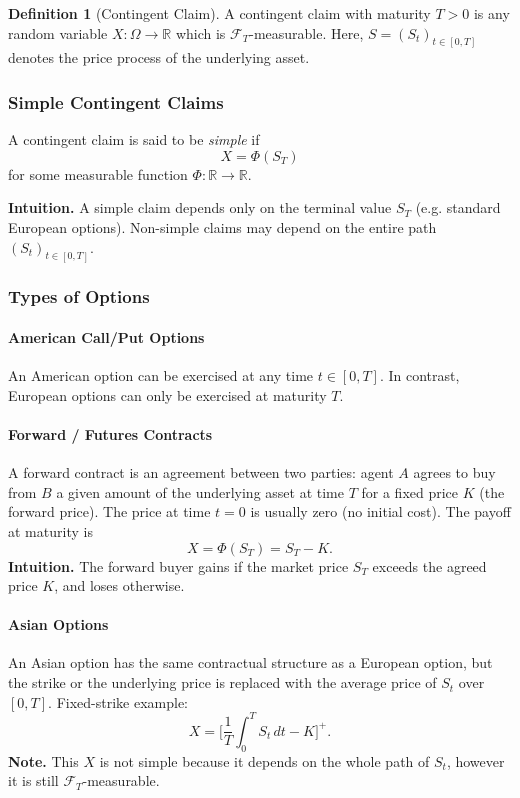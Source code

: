 \documentclass[12pt,a4paper]{article}
\theoremstyle{definition}
\newtheorem{definition}{Definition}[section]
\newcommand{\R}{\mathbb{R}}
\begin{document}
\begin{definition}[Contingent Claim]
A contingent claim with maturity $T>0$ is any random variable $X:\Omega\to\R$ which is $\mathcal{F}_T$-measurable. Here, $S=(S_t)_{t\in[0,T]}$ denotes the price process of the underlying asset.
\end{definition}

\subsubsection*{Simple Contingent Claims}
A contingent claim is said to be \emph{simple} if
\[
X = \Phi(S_T)
\]
for some measurable function $\Phi:\R\to\R$.

\textbf{Intuition.} A simple claim depends only on the terminal value $S_T$ (e.g. standard European options). Non-simple claims may depend on the entire path $(S_t)_{t\in[0,T]}$.

\subsubsection*{Types of Options}

\paragraph{American Call/Put Options} An American option can be exercised at any time $t\in[0,T]$. In contrast, European options can only be exercised at maturity $T$.

\paragraph{Forward / Futures Contracts} A forward contract is an agreement between two parties: agent $A$ agrees to buy from $B$ a given amount of the underlying asset at time $T$ for a fixed price $K$ (the forward price). The price at time $t=0$ is usually zero (no initial cost). The payoff at maturity is
\[
X = \Phi(S_T) = S_T - K.
\]
\textbf{Intuition.} The forward buyer gains if the market price $S_T$ exceeds the agreed price $K$, and loses otherwise.

\paragraph{Asian Options} An Asian option has the same contractual structure as a European option, but the strike or the underlying price is replaced with the average price of $S_t$ over $[0,T]$. Fixed-strike example:
\[
X = \Bigg[\frac{1}{T}\int_0^T S_t\,dt - K\Bigg]^+.
\]
\textbf{Note.} This $X$ is not simple because it depends on the whole path of $S_t$, however it is still $\mathcal{F}_T$-measurable.
\end{document}
